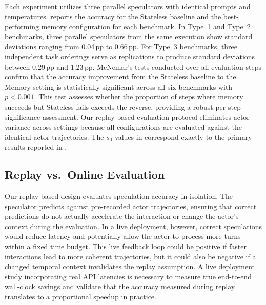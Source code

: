 \documentclass{article}
\begin{document}


Each experiment utilizes three parallel speculators with identical prompts and temperatures.  reports the accuracy for the Stateless baseline and the best-performing memory configuration for each benchmark. In Type~1 and Type~2 benchmarks, three parallel speculators from the same execution show standard deviations ranging from 0.04\,pp to 0.66\,pp. For Type~3 benchmarks, three independent task orderings serve as replications to produce standard deviations between 0.29\,pp and 1.23\,pp. McNemar's tests conducted over all evaluation steps confirm that the accuracy improvement from the Stateless baseline to the Memory setting is statistically significant across all six benchmarks with $p < 0.001$. This test assesses whether the proportion of steps where memory succeeds but Stateless fails exceeds the reverse, providing a robust per-step significance assessment. Our replay-based evaluation protocol eliminates actor variance across settings because all configurations are evaluated against the identical actor trajectories. The $s_0$ values in  correspond exactly to the primary results reported in .

\subsection{Replay vs.\ Online Evaluation}
\label{app:replay_online}
Our replay-based design evaluates speculation accuracy in isolation. The speculator predicts against pre-recorded actor trajectories, ensuring that correct predictions do not actually accelerate the interaction or change the actor's context during the evaluation. In a live deployment, however, correct speculations would reduce latency and potentially allow the actor to process more turns within a fixed time budget. This live feedback loop could be positive if faster interactions lead to more coherent trajectories, but it could also be negative if a changed temporal context invalidates the replay assumption. A live deployment study incorporating real API latencies is necessary to measure true end-to-end wall-clock savings and validate that the accuracy measured during replay translates to a proportional speedup in practice.
\end{document}
